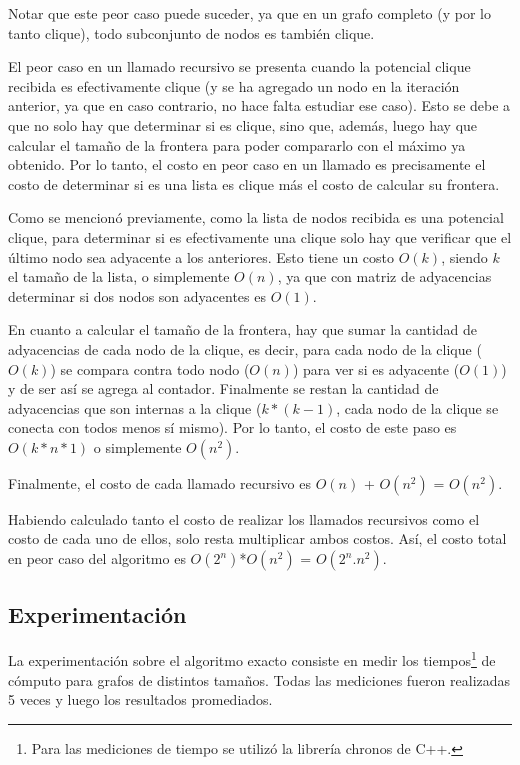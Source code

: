 Notar que este peor caso puede suceder, ya que en un grafo completo (y por lo tanto clique), todo subconjunto de nodos es también clique.

El peor caso en un llamado recursivo se presenta cuando la potencial clique recibida es efectivamente clique (y se ha agregado un nodo en la iteración anterior, ya que en caso contrario, no hace falta estudiar ese caso). Esto se debe a que no solo hay que determinar si es clique, sino que, además, luego hay que calcular el tamaño de la frontera para poder compararlo con el máximo ya obtenido. Por lo tanto, el costo en peor caso en un llamado es precisamente el costo de determinar si es una lista es clique más el costo de calcular su frontera.

Como se mencionó previamente, como la lista de nodos recibida es una potencial clique, para determinar si es efectivamente una clique solo hay que verificar que el último nodo sea adyacente a los anteriores. Esto tiene un costo $O(k)$, siendo $k$ el tamaño de la lista, o simplemente $O(n)$, ya que con matriz de adyacencias determinar si dos nodos son adyacentes es $O(1)$.

En cuanto a calcular el tamaño de la frontera, hay que sumar la cantidad de adyacencias de cada nodo de la clique, es decir, para cada nodo de la clique ($O(k)$) se compara contra todo nodo ($O(n)$) para ver si es adyacente ($O(1)$) y de ser así se agrega al contador. Finalmente se restan la cantidad de adyacencias que son internas a la clique ($k*(k-1)$, cada nodo de la clique se conecta con todos menos sí mismo). Por lo tanto, el costo de este paso es $O(k*n*1)$ o simplemente $O(n^2)$.

Finalmente, el costo de cada llamado recursivo es $O(n)$ + $O(n^2)$ = $O(n^2)$.

Habiendo calculado tanto el costo de realizar los llamados recursivos como el costo de cada uno de ellos, solo resta multiplicar ambos costos. Así, el costo total en peor caso del algoritmo es $O(2^n)$*$O(n^2)$ = $O(2^n.n^2)$.

\subsection{Experimentación}

La experimentación sobre el algoritmo exacto consiste en medir los tiempos\footnote{Para las mediciones de tiempo se utilizó la librería chronos de C++.} de cómputo para grafos de distintos tamaños. Todas las mediciones fueron realizadas 5 veces y luego los resultados promediados.

